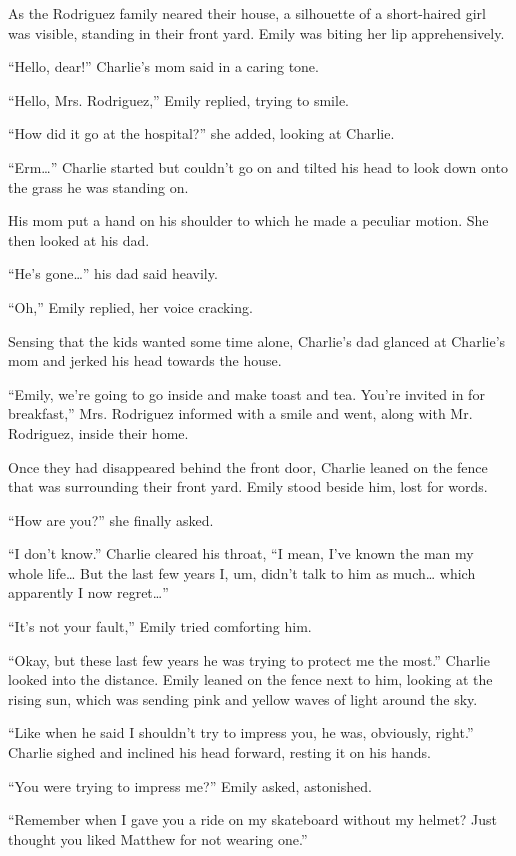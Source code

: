 As the Rodriguez family neared their house, a silhouette of a short-haired girl was visible, standing in their front yard. Emily was biting her lip apprehensively.

“Hello, dear!” Charlie's mom said in a caring tone.

“Hello, Mrs. Rodriguez,” Emily replied, trying to smile.

“How did it go at the hospital?” she added, looking at Charlie.

“Erm…” Charlie started but couldn't go on and tilted his head to look down onto the grass he was standing on.

His mom put a hand on his shoulder to which he made a peculiar motion. She then looked at his dad.

“He's gone…” his dad said heavily.

“Oh,” Emily replied, her voice cracking.

Sensing that the kids wanted some time alone, Charlie's dad glanced at Charlie's mom and jerked his head towards the house.

“Emily, we're going to go inside and make toast and tea. You're invited in for breakfast,” Mrs. Rodriguez informed with a smile and went, along with Mr. Rodriguez, inside their home.

Once they had disappeared behind the front door, Charlie leaned on the fence that was surrounding their front yard. Emily stood beside him, lost for words.

“How are you?” she finally asked.

“I don't know.” Charlie cleared his throat, “I mean, I've known the man my whole life… But the last few years I, um, didn't talk to him as much… which apparently I now regret…”

“It's not your fault,” Emily tried comforting him.

“Okay, but these last few years he was trying to protect me the most.” Charlie looked into the distance. Emily leaned on the fence next to him, looking at the rising sun, which was sending pink and yellow waves of light around the sky.

“Like when he said I shouldn't try to impress you, he was, obviously, right.” Charlie sighed and inclined his head forward, resting it on his hands.

“You were trying to impress me?” Emily asked, astonished.

“Remember when I gave you a ride on my skateboard without my helmet? Just thought you liked Matthew for not wearing one.”

